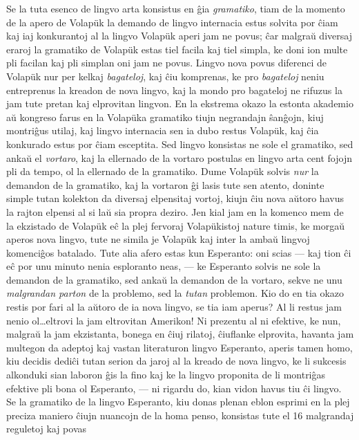    Se la tuta esenco de lingvo arta konsistus en \^gia {\sl gramatiko}, tiam
de la momento de la apero de Volap\"uk la demando de lingvo
internacia estus solvita por \^ciam kaj iaj konkurantoj al la lingvo
Volap\"uk aperi jam ne povus; \^car malgra\u u diversaj eraroj la
gramatiko de Volap\"uk estas tiel facila kaj tiel simpla, ke doni
ion multe pli facilan kaj pli simplan oni jam ne povus. Lingvo nova
povus diferenci de Volap\"uk nur per kelkaj {\sl bagateloj}, kaj
\^ciu komprenas, ke pro {\sl bagateloj} neniu entreprenus la kreadon
de nova lingvo, kaj la mondo pro bagateloj ne rifuzus la jam tute
pretan kaj elprovitan lingvon. En la ekstrema okazo la estonta
akademio a\u u kongreso farus en la Volap\"uka gramatiko tiujn
negrandajn \^san\^gojn, kiuj montri\^gus utilaj, kaj lingvo
internacia sen ia dubo restus Volap\"uk, kaj \^cia konkurado estus
por \^ciam esceptita. Sed lingvo konsistas ne sole el gramatiko, sed
anka\u u el {\sl vortaro}, kaj la ellernado de la vortaro postulas
en lingvo arta cent fojojn pli da tempo, ol la ellernado de la
gramatiko. Dume Volap\"uk solvis {\sl nur} la demandon de la
gramatiko, kaj la vortaron \^gi lasis tute sen atento, doninte
simple tutan kolekton da diversaj elpensitaj vortoj, kiujn \^ciu
nova a\u utoro havus la rajton elpensi al si la\u u sia propra
deziro. Jen kial jam en la komenco mem de la ekzistado de Volap\"uk
e\^c la plej fervoraj Volap\"ukistoj nature timis, ke morga\u u
aperos nova lingvo, tute ne simila je Volap\"uk kaj inter la amba\u
u lingvoj komenci\^gos batalado. Tute alia afero estas kun
Esperanto: oni scias --- kaj tion \^ci e\^c por unu minuto nenia
esploranto neas, --- ke Esperanto solvis ne sole la demandon de la
gramatiko, sed anka\u u la demandon de la vortaro, sekve ne unu {\sl
malgrandan parton} de la problemo, sed la {\sl tutan} problemon. Kio
do en tia okazo restis por fari al la a\u utoro de ia nova lingvo,
se tia iam aperus? Al li restus jam nenio ol\dots eltrovi la jam
eltrovitan Amerikon! Ni prezentu al ni efektive, ke nun, malgra\u u
la jam ekzistanta, bonega en \^ciuj rilatoj, \^ciuflanke elprovita,
havanta jam multegon da adeptoj kaj vastan literaturon lingvo
Esperanto, aperis tamen homo, kiu decidis dedi\^ci tutan serion da
jaroj al la kreado de nova lingvo, ke li sukcesis alkonduki sian
laboron \^gis la fino kaj ke la lingvo proponita de li montri\^gas
efektive pli bona ol Esperanto, --- ni rigardu do, kian vidon havus
tiu \^ci lingvo. Se la gramatiko de la lingvo Esperanto, kiu donas
plenan eblon esprimi en la plej preciza maniero \^ciujn nuancojn de
la homa penso, konsistas tute el 16 malgrandaj reguletoj kaj povas
